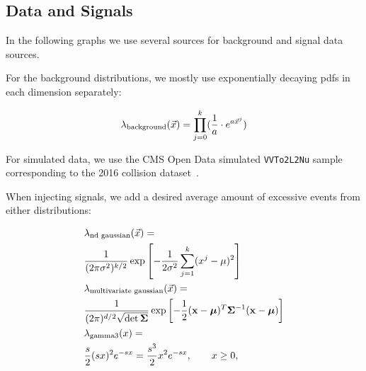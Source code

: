 \documentclass[paper/ddppaper2.tex]{subfiles}
\begin{document}
\subsection{Data and Signals}

In the following graphs we use several sources for background and signal data sources.

For the background distributions, we mostly use exponentially decaying pdfs in each dimension separately:

\begin{equation}
    {{\lambda}_{\text{background}}(\vec{{x}})} = \prod\limits_{j=0}^k (\dfrac{1}{a} \cdot e^{a\vec{{x}}^j})
\end{equation}

For simulated data, we use the CMS Open Data simulated \texttt{VVTo2L2Nu} sample corresponding to the 2016 collision dataset~\cite{CMS_OpenData_VVTo2L2Nu_2016}.

When injecting signals, we add a desired average amount of excessive events from either distributions:

\begin{equation}
\label{eq:signal-shapes}
\begin{aligned}
    &\dist{\text{nd gaussian}}
    ={}\\
    &
    \frac{1}{(2\pi\sigma^2)^{k/2}}
    \exp\left[
        -\frac{1}{2\sigma^2}
        \sum_{j=1}^{k}(x^j-\mu)^2
    \right]
    \\
    &\dist{\text{multivariate gaussian}}
    ={}\\
    &
    \frac{1}
    {(2\pi)^{d/2}\sqrt{\det\boldsymbol{\Sigma}}}
    \exp\left[
        -\frac{1}{2}
        (\mathbf{x}-\boldsymbol{\mu})^{T}
        \boldsymbol{\Sigma}^{-1}
        (\mathbf{x}-\boldsymbol{\mu})
    \right]
    \\
    &\pdf_{\text{gamma3}}(\eventsymbol)
    ={}\\
    &
    \frac{s}{2}
    (s \eventsymbol)^2
    e^{-s \eventsymbol}
    =
    \frac{s^3}{2}\eventsymbol^2 e^{-s \eventsymbol},
    \qquad \eventsymbol \geq 0,
\end{aligned}
\end{equation}
\end{document}

